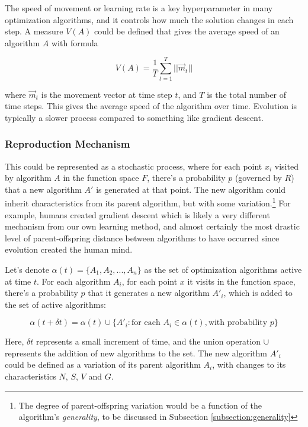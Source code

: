 \documentclass{article}[10pt]
\begin{document}
The speed of movement or learning rate is a key hyperparameter in many optimization algorithms, and it controls how much the solution changes in each step. 
A measure \( V(A) \) could be defined that gives the average speed of an algorithm \( A \) with formula

\[ V(A) = \frac{1}{T}\sum_{t=1}^{T} ||\vec{m}_t|| \] 

\noindent where \( \vec{m}_t \) is the movement vector at time step \( t \), and \( T \) is the total number of time steps. 
This gives the average speed of the algorithm over time. 
Evolution is typically a slower process compared to something like gradient descent.






\subsubsection{Reproduction Mechanism}
\label{subsubsection:reproduction}
This could be represented as a stochastic process, where for each point \( x_i \) visited by algorithm \( A \) in the function space \( F \), there's a probability \( p \) (governed by \( R \)) that a new algorithm \( A' \) is generated at that point. 
The new algorithm could inherit characteristics from its parent algorithm, but with some variation.\footnote{
    The degree of parent-offspring variation would be a function of the algorithm's \textit{generality}, to be discussed in Subsection \ref{subsection:generality}
}
For example, humans created gradient descent which is likely a very different mechanism from our own learning method, and almost certainly the most drastic level of parent-offspring distance between algorithms to have occurred since evolution created the human mind.\par

Let's denote \( \alpha (t) = \{A_1, A_2, ..., A_n\} \) as the set of optimization algorithms active at time \( t \). 
For each algorithm \( A_i \), for each point \( x \) it visits in the function space, there's a probability \( p \) that it generates a new algorithm \( A'_i \), which is added to the set of active algorithms:

\[
\alpha(t + \delta t) = \alpha(t) \cup \{A'_i : \text{for each } A_i \in \alpha(t), \text{with probability } p\}
\]

Here, \( \delta t \) represents a small increment of time, and the union operation \( \cup \) represents the addition of new algorithms to the set. 
The new algorithm \(A'_i \) could be defined as a variation of its parent algorithm \( A_i \), with changes to its characteristics \( N \), \( S \), \( V \) and \( G \).\par
\end{document}
